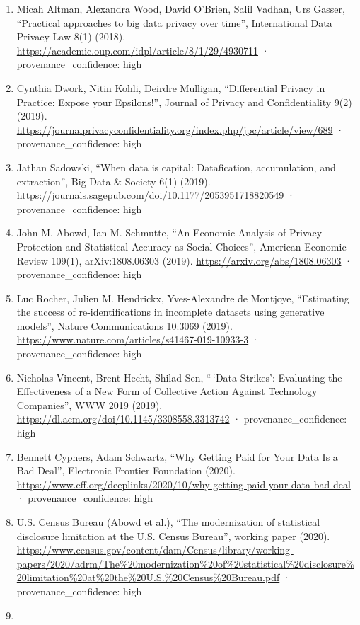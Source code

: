 \documentclass[
  11pt,
]{article}
\begin{document}
\begin{enumerate}
\item
  Micah Altman, Alexandra Wood, David O'Brien, Salil Vadhan, Urs Gasser,
  ``Practical approaches to big data privacy over time'', International
  Data Privacy Law 8(1) (2018).
  \url{https://academic.oup.com/idpl/article/8/1/29/4930711} ·
  provenance\_confidence: high
\item
  Cynthia Dwork, Nitin Kohli, Deirdre Mulligan, ``Differential Privacy
  in Practice: Expose your Epsilons!'', Journal of Privacy and
  Confidentiality 9(2) (2019).
  \url{https://journalprivacyconfidentiality.org/index.php/jpc/article/view/689}
  · provenance\_confidence: high
\item
  Jathan Sadowski, ``When data is capital: Datafication, accumulation,
  and extraction'', Big Data \& Society 6(1) (2019).
  \url{https://journals.sagepub.com/doi/10.1177/2053951718820549} ·
  provenance\_confidence: high
\item
  John M. Abowd, Ian M. Schmutte, ``An Economic Analysis of Privacy
  Protection and Statistical Accuracy as Social Choices'', American
  Economic Review 109(1), arXiv:1808.06303 (2019).
  \url{https://arxiv.org/abs/1808.06303} · provenance\_confidence: high
\item
  Luc Rocher, Julien M. Hendrickx, Yves-Alexandre de Montjoye,
  ``Estimating the success of re-identifications in incomplete datasets
  using generative models'', Nature Communications 10:3069 (2019).
  \url{https://www.nature.com/articles/s41467-019-10933-3} ·
  provenance\_confidence: high
\item
  Nicholas Vincent, Brent Hecht, Shilad Sen, ``\,`Data Strikes':
  Evaluating the Effectiveness of a New Form of Collective Action
  Against Technology Companies'', WWW 2019 (2019).
  \url{https://dl.acm.org/doi/10.1145/3308558.3313742} ·
  provenance\_confidence: high
\item
  Bennett Cyphers, Adam Schwartz, ``Why Getting Paid for Your Data Is a
  Bad Deal'', Electronic Frontier Foundation (2020).
  \url{https://www.eff.org/deeplinks/2020/10/why-getting-paid-your-data-bad-deal}
  · provenance\_confidence: high
\item
  U.S. Census Bureau (Abowd et al.), ``The modernization of statistical
  disclosure limitation at the U.S. Census Bureau'', working paper
  (2020).
  \url{https://www.census.gov/content/dam/Census/library/working-papers/2020/adrm/The\%20modernization\%20of\%20statistical\%20disclosure\%20limitation\%20at\%20the\%20U.S.\%20Census\%20Bureau.pdf}
  · provenance\_confidence: high
\item

\end{enumerate}
\end{document}
